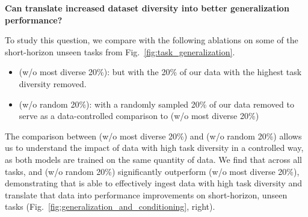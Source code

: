 \noindent \textbf{Can \MethodName{} translate increased dataset diversity into better generalization performance?}

To study this question, we compare \MethodName{} with the following ablations on some of the short-horizon unseen tasks from Fig.~\ref{fig:task_generalization}.
\begin{itemize}
    \item \MethodName{} (w/o most diverse 20\%): \MethodName{} but with the 20\% of our data with the highest task diversity removed.
    \item \MethodName{} (w/o random 20\%): \MethodName{} with a randomly sampled 20\% of our data removed to serve as a data-controlled comparison to \MethodName{} (w/o most diverse 20\%)
\end{itemize}

The comparison between \MethodName{} (w/o most diverse 20\%) and \MethodName{} (w/o random 20\%) allows us to understand the impact of data with high task diversity in a controlled way, as both models are trained on the same quantity of data. We find that across all tasks, \MethodName{} and \MethodName{} (w/o random 20\%) significantly outperform \MethodName{} (w/o most diverse 20\%), demonstrating that \MethodName{} is able to effectively ingest data with high task diversity and translate that data into performance improvements on short-horizon, unseen tasks (Fig.~\ref{fig:generalization_and_conditioning}, right).

